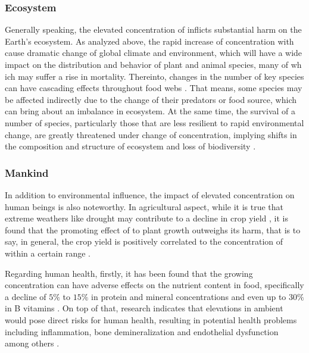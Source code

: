 \documentclass[12pt,a4paper]{article}
\begin{document}
    \subsubsection{Ecosystem}
    Generally speaking, the elevated concentration of  inflicts substantial harm on the Earth's ecosystem. As analyzed above, the rapid increase of  concentration with cause dramatic change of global climate and environment, which will have a wide impact on the distribution and behavior of plant and animal species, many of wh ich may suffer a rise in mortality. Thereinto, changes in the number of key species can have cascading effects throughout food webs \autocite{schindler_influence_1997}. That means, some species may be affected indirectly due to the change of their predators or food source, which can bring about an imbalance in ecosystem. At the same time, the survival of a number of species, particularly those that are less resilient to rapid environmental change, are greatly threatened under change of  concentration, implying shifts in the composition and structure of ecosystem and loss of biodiversity \autocite{korner_biodiversity_1995}.
    \subsubsection{Mankind}
    In addition to environmental influence, the impact of elevated  concentration on human beings is also noteworthy. In agricultural aspect, while it is true that extreme weathers like drought may contribute to a decline in crop yield \autocite{sun_does_2023}, it is found that the promoting effect of  to plant growth outweighs its harm, that is to say, in general, the crop yield is positively correlated to the concentration of  within a certain range \autocite{yang_rice_2024}.

    Regarding human health, firstly, it has been found that the growing  concentration can have adverse effects on the nutrient content in food, specifically a decline of $5\%$ to $15\%$ in protein and mineral concentrations and even up to $30\%$ in B vitamins \autocite{loladze_hidden_2014,myers_increasing_2014,zhu_carbon_2018}. On top of that, research indicates that elevations in ambient  would pose direct risks for human health, resulting in potential health problems including inflammation, bone demineralization and endothelial dysfunction among others \autocite{jacobson_direct_2019}.
    
\end{document}
